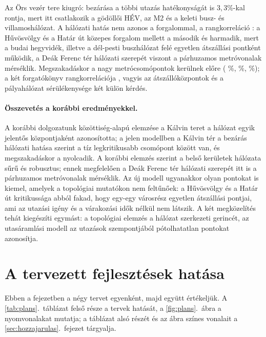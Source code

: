 \documentclass[12pt,a4paper]{article}
\theoremstyle{definition}
\theoremstyle{remark}
\begin{document}
Az Örs vezér tere kiugró: bezárása a többi utazás hatékonyságát is
$3{,}3\%$-kal rontja, mert itt csatlakozik a gödöllői HÉV, az M2 és a keleti
busz- és villamoshálózat. A hálózati hatás nem azonos a forgalommal, a
rangkorreláció \RHOTHRU: a Hűvösvölgy és a Határ út közepes forgalom mellett
a második és harmadik, mert a budai hegyvidék, illetve a dél-pesti
buszhálózat felé egyetlen átszállási pontként működik, a Deák Ferenc tér
hálózati szerepét viszont a párhuzamos metróvonalak mérséklik.
Megszakadáskor a nagy metrócsomópontok kerülnek előre (\FAILNAMEA{}
\FAILNETA\%, \FAILNAMEB{} \FAILNETB\%, \FAILNAMEC{} \FAILNETC\%); a két
forgatókönyv rangkorrelációja \RHOCF, vagyis az átszállóközpontok és a
pályahálózat sérülékenysége két külön kérdés.


\paragraph{Összevetés a korábbi eredményekkel.}
A korábbi dolgozatunk közöttiség-alapú elemzése a Kálvin teret a hálózat
egyik jelentős központjaként azonosította; a jelen modellben a Kálvin tér a
bezárás hálózati hatása szerint a tíz legkritikusabb csomópont között van, és
megszakadáskor a nyolcadik. A korábbi elemzés szerint a belső
kerületek hálózata sűrű és robusztus; ennek megfelelően a Deák Ferenc tér
hálózati szerepét itt is a párhuzamos metróvonalak mérséklik. Az új modell
ugyanakkor olyan pontokat is kiemel, amelyek a topológiai mutatókon nem
feltűnőek: a Hűvösvölgy és a Határ út kritikussága abból fakad, hogy egy-egy
városrész egyetlen átszállási pontjai, ami az utazási igény és a várakozási
idők nélkül nem látszik. A két megközelítés tehát kiegészíti egymást: a
topológiai elemzés a hálózat szerkezeti gerincét, az utasáramlási modell az
utazások szempontjából pótolhatatlan pontokat azonosítja.

\section{A tervezett fejlesztések hatása}
\label{sec:tervek}

Ebben a fejezetben a négy tervet egyenként, majd együtt értékeljük. A
\ref{tab:plans}.~táblázat felső része a tervek hatását, a
\ref{fig:plans}.~ábra a nyomvonalakat mutatja; a táblázat alsó részét és az
ábra színes vonalait a \ref{sec:hozzajarulas}.~fejezet tárgyalja.
\end{document}
